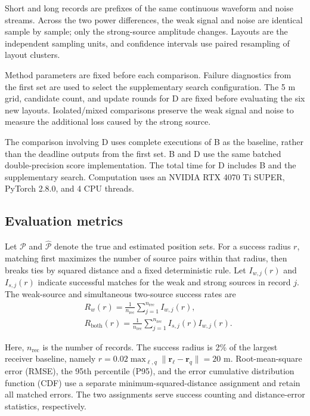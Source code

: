 \documentclass[11pt,a4paper]{article}
\numberwithin{equation}{section}
\numberwithin{figure}{section}
\numberwithin{table}{section}
\begin{document}
Short and long records are prefixes of the same continuous waveform and noise streams. Across the two power differences, the weak signal and noise are identical sample by sample; only the strong-source amplitude changes. Layouts are the independent sampling units, and confidence intervals use paired resampling of layout clusters.

Method parameters are fixed before each comparison. Failure diagnostics from the first set are used to select the supplementary search configuration. The 5 m grid, candidate count, and update rounds for D are fixed before evaluating the six new layouts. Isolated/mixed comparisons preserve the weak signal and noise to measure the additional loss caused by the strong source.

The comparison involving D uses complete executions of B as the baseline, rather than the deadline outputs from the first set. B and D use the same batched double-precision score implementation. The total time for D includes B and the supplementary search. Computation uses an NVIDIA RTX 4070 Ti SUPER, PyTorch 2.8.0, and 4 CPU threads.

\subsection{Evaluation metrics}\label{sec:3.2}

Let $\mathcal{P}$ and $\widehat{\mathcal{P}}$ denote the true and estimated position sets. For a success radius $r$, matching first maximizes the number of source pairs within that radius, then breaks ties by squared distance and a fixed deterministic rule. Let $I_{w,j}(r)$ and $I_{s,j}(r)$ indicate successful matches for the weak and strong sources in record $j$. The weak-source and simultaneous two-source success rates are
\begin{equation}\label{eq:3.1}
\begin{aligned}
&R_w(r)=\frac{1}{n_{\mathrm{rec}}}\sum_{j=1}^{n_{\mathrm{rec}}}I_{w,j}(r), \\
& R_{\mathrm{both}}(r) =\frac{1}{n_{\mathrm{rec}}}\sum_{j=1}^{n_{\mathrm{rec}}}I_{s,j}(r)I_{w,j}(r).
\end{aligned}
\end{equation}

Here, $n_{\mathrm{rec}}$ is the number of records. The success radius is 2\% of the largest receiver baseline, namely $r=0.02\max_{\ell,q}\|\mathbf{r}_\ell-\mathbf{r}_q\|=20$ m. Root-mean-square error (RMSE), the 95th percentile (P95), and the error cumulative distribution function (CDF) use a separate minimum-squared-distance assignment and retain all matched errors. The two assignments serve success counting and distance-error statistics, respectively.
\end{document}
